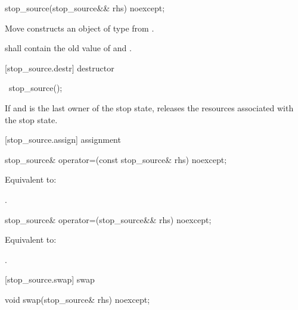 {%
\begin{itemdecl}
stop_source(stop_source&& rhs) noexcept;
\end{itemdecl}
\begin{itemdescr}
  \pnum\effects Move constructs an object of type  from .

  \pnum\postconditions {} shall contain the old value of  and
                        .
\end{itemdescr}

[stop_source.destr]{ destructor}

%
\begin{itemdecl}
~stop_source();
\end{itemdecl}

\begin{itemdescr}
 \pnum\effects If  and  is the last owner of the stop state,
                releases the resources associated with the stop state.
\end{itemdescr}

[stop_source.assign]{ assignment}

%
\begin{itemdecl}
stop_source& operator=(const stop_source& rhs) noexcept;
\end{itemdecl}
\begin{itemdescr}
  \pnum\effects Equivalent to: 

  \pnum\returns {}.
\end{itemdescr}

%
\begin{itemdecl}
stop_source& operator=(stop_source&& rhs) noexcept;
\end{itemdecl}
\begin{itemdescr}
  \pnum\effects Equivalent to: 

  \pnum\returns {}.
\end{itemdescr}

[stop_source.swap]{ swap}

%
\begin{itemdecl}
void swap(stop_source& rhs) noexcept;
\end{itemdecl}

}
